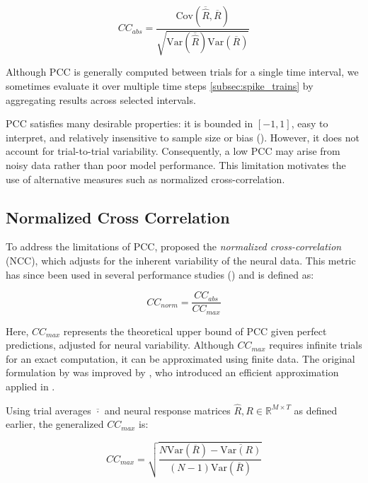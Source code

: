 \begin{equation}
    CC_{abs} = \frac{\text{Cov}(\overline{\hat{R}}, \overline{R})}
    {\sqrt{\text{Var}(\overline{\hat{R}})\text{Var}(\overline{R})}}
\end{equation}
\label{eq:cc_abs}

Although PCC is generally computed between trials for a single time interval, we sometimes evaluate it over multiple time steps \ref{subsec:spike_trains} by aggregating results across selected intervals.

PCC satisfies many desirable properties: it is bounded in $[-1, 1]$, easy to interpret, and relatively insensitive to sample size or bias (\citet{Wang2023towards}). However, it does not account for trial-to-trial variability. Consequently, a low PCC may arise from noisy data rather than poor model performance. This limitation motivates the use of alternative measures such as normalized cross-correlation.

\subsection{Normalized Cross Correlation}
\label{subsec:normalized_cross_correlation}

To address the limitations of PCC, \citet{hsu_quantifying_2004} proposed the \emph{normalized cross-correlation} (NCC), which adjusts for the inherent variability of the neural data. This metric has since been used in several performance studies (\citet{touryan_spatial_2005, gill_sound_2006, Wang2023towards}) and is defined as:

\begin{equation}
    CC_{norm} = \frac{CC_{abs}}{CC_{max}}
\end{equation}
\label{eq:normalized_cc}

Here, $CC_{max}$ represents the theoretical upper bound of PCC given perfect predictions, adjusted for neural variability. Although $CC_{max}$ requires infinite trials for an exact computation, it can be approximated using finite data. The original formulation by \citet{hsu_quantifying_2004} was improved by \citet{schoppe_measuring_2016}, who introduced an efficient approximation applied in \citet{Wang2023towards}.

Using trial averages $\overline{\cdot}$ and neural response matrices $\hat{R}, R \in \mathbb{R}^{M \times T}$ as defined earlier, the generalized $CC_{max}$ is:

\begin{equation}
    CC_{max} = \sqrt{\frac{N\text{Var}(\overline{R}) - \overline{\text{Var}(R)}}{(N-1)\text{Var}(\overline{R})}}
\end{equation}
\label{eq:cc_max_general}


